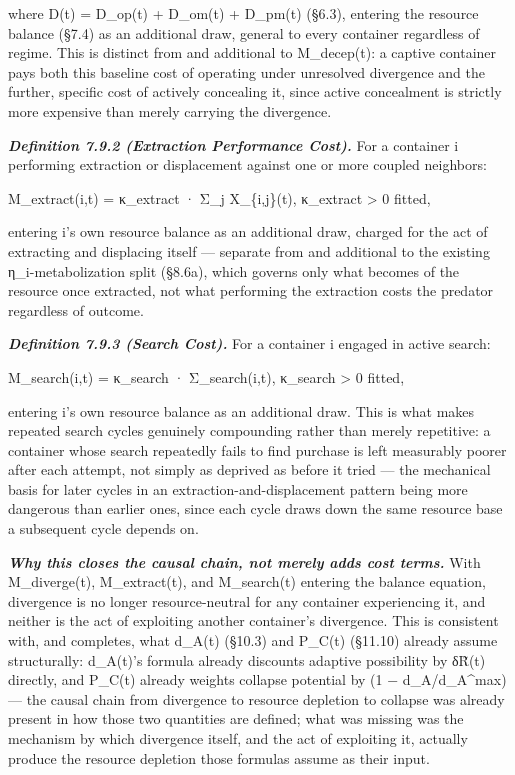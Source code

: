 \documentclass[
]{article}
\begin{document}
where D(t) = D\_op(t) + D\_om(t) + D\_pm(t) (§6.3), entering the
resource balance (§7.4) as an additional draw, general to every
container regardless of regime. This is distinct from and additional to
M\_decep(t): a captive container pays both this baseline cost of
operating under unresolved divergence and the further, specific cost of
actively concealing it, since active concealment is strictly more
expensive than merely carrying the divergence.

\emph{\textbf{Definition 7.9.2 (Extraction Performance Cost).}} For a
container i performing extraction or displacement against one or more
coupled neighbors:

M\_extract(i,t) = κ\_extract · Σ\_j X\_\{i,j\}(t), κ\_extract
\textgreater{} 0 fitted,

entering i's own resource balance as an additional draw, charged for the
act of extracting and displacing itself --- separate from and additional
to the existing η\_i-metabolization split (§8.6a), which governs only
what becomes of the resource once extracted, not what performing the
extraction costs the predator regardless of outcome.

\emph{\textbf{Definition 7.9.3 (Search Cost).}} For a container i
engaged in active search:

M\_search(i,t) = κ\_search · Σ\_search(i,t), κ\_search \textgreater{} 0
fitted,

entering i's own resource balance as an additional draw. This is what
makes repeated search cycles genuinely compounding rather than merely
repetitive: a container whose search repeatedly fails to find purchase
is left measurably poorer after each attempt, not simply as deprived as
before it tried --- the mechanical basis for later cycles in an
extraction-and-displacement pattern being more dangerous than earlier
ones, since each cycle draws down the same resource base a subsequent
cycle depends on.

\emph{\textbf{Why this closes the causal chain, not merely adds cost
terms.}} With M\_diverge(t), M\_extract(t), and M\_search(t) entering
the balance equation, divergence is no longer resource-neutral for any
container experiencing it, and neither is the act of exploiting another
container's divergence. This is consistent with, and completes, what
d\_A(t) (§10.3) and P\_C(t) (§11.10) already assume structurally:
d\_A(t)'s formula already discounts adaptive possibility by δR̃(t)
directly, and P\_C(t) already weights collapse potential by (1 −
d\_A/d\_A\^{}max) --- the causal chain from divergence to resource
depletion to collapse was already present in how those two quantities
are defined; what was missing was the mechanism by which divergence
itself, and the act of exploiting it, actually produce the resource
depletion those formulas assume as their input.
\end{document}
